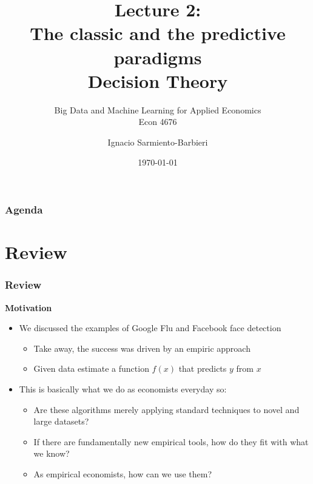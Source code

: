 \documentclass[
  shownotes,
  xcolor={svgnames},
  hyperref={colorlinks,citecolor=DarkBlue,linkcolor=DarkRed,urlcolor=DarkBlue}
  , aspectratio=169]{beamer}
\begin{document}
\title[Lecture 2]{Lecture 2: \\ The classic and the predictive paradigms \\ Decision Theory}
\subtitle{Big Data and Machine Learning for Applied Economics \\ Econ 4676}
\date{\today}

\author[Sarmiento-Barbieri]{Ignacio Sarmiento-Barbieri}


\begin{frame}[noframenumbering]
\maketitle
\end{frame}





\begin{frame}
\frametitle{Agenda}

\tableofcontents


\end{frame}




\section{Review}
\begin{frame}
\frametitle{Review}


{\bf Motivation}

\bigskip

\begin{itemize}
      \item We discussed the examples of Google Flu and Facebook face detection
      \medskip
      \begin{itemize}
        \item Take away, the success was driven by an empiric approach
        \item Given data  estimate a function $f(x)$ that predicts $y$ from $x$
      \end{itemize}
      \medskip

      \item  This is basically what we do as economists everyday so:
      \begin{itemize}
        \item  Are these algorithms merely applying standard techniques to novel and large datasets?
        \item  If there are fundamentally new empirical tools, how do they fit with what we know?
        \item  As empirical economists, how can we use them?
       \end{itemize}
\end{itemize}

\end{frame}
\end{document}
